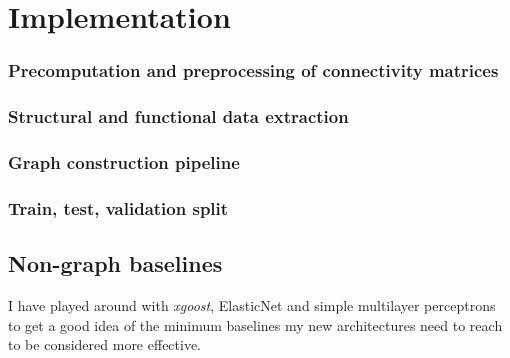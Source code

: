 \documentclass[12pt,a4paper,twoside, openright, hidelinks]{report}
\begin{document}
\chapter{Implementation}

\subsection{Precomputation and preprocessing of connectivity matrices}

\subsection{Structural and functional data extraction}

\subsection{Graph construction pipeline}

\subsection{Train, test, validation split}

\section{Non-graph baselines}
I have played around with \textit{xgoost}, ElasticNet and simple multilayer perceptrons to get a good idea of the minimum baselines my new architectures need to reach to be considered more effective.
\end{document}

